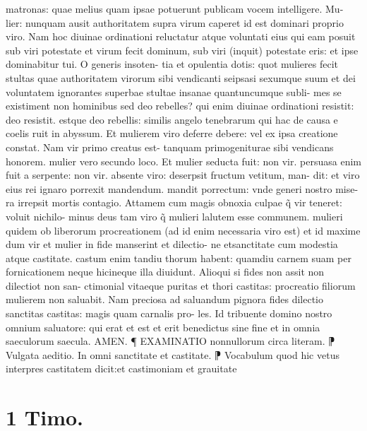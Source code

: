 \documentclass{article}
\begin{document}
\begin{pages}
matronas: quae melius quam ipsae potuerunt publicam vocem intelligere. Mu- lier: nunquam ausit authoritatem supra virum caperet id est dominari proprio viro. Nam hoc diuinae ordinationi reluctatur atque voluntati eius qui eam posuit sub viri potestate et virum fecit dominum, sub viri (inquit) potestate eris: et ipse dominabitur tui. O generis insoten- tia et opulentia dotis: quot mulieres fecit stultas quae authoritatem virorum sibi vendicanti seipsasi sexumque suum et dei voluntatem ignorantes superbae stultae insanae quantuncumque subli- mes se existiment non hominibus sed deo rebelles? qui enim diuinae ordinationi resistit: deo resistit. estque deo rebellis: similis angelo tenebrarum qui hac de causa e coelis ruit in abyssum. Et mulierem viro deferre debere: vel ex ipsa creatione constat. Nam vir primo creatus est- tanquam primogeniturae sibi vendicans honorem. mulier vero secundo loco. Et mulier seducta fuit: non vir. persuasa enim fuit a serpente: non vir. absente viro: deserpsit fructum vetitum, man- dit: et viro eius rei ignaro porrexit mandendum. mandit porrectum: vnde generi nostro mise- ra irrepsit mortis contagio. Attamem cum magis obnoxia culpae q̃ vir teneret: voluit nichilo- minus deus tam viro q̃ mulieri lalutem esse communem. mulieri quidem ob liberorum procreationem (ad id enim necessaria viro est) et id maxime dum vir et mulier in fide manserint et dilectio- ne etsanctitate cum modestia atque castitate. castum enim tandiu thorum habent: quamdiu carnem suam per fornicationem neque hicineque illa diuidunt. Alioqui si fides non assit non dilectiot non san- ctimonial vitaeque puritas et thori castitas: procreatio filiorum mulierem non saluabit. Nam preciosa ad saluandum pignora fides dilectio sanctitas castitas: magis quam carnalis pro- les. Id tribuente domino nostro omnium saluatore: qui erat et est et erit benedictus sine fine et in omnia saeculorum saecula. AMEN.  \pend\pstart  ¶ EXAMINATIO nonnullorum circa literam. ⁋ Vulgata aeditio. In omni sanctitate et  castitate. ⁋ Vocabulum quod hic vetus interpres castitatem dicit:et castimoniam et grauitate  \pend
\section*{1 Timo. }

\end{pages}
\end{document}
